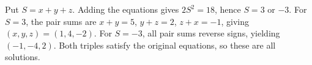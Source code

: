 Put $S=x+y+z$. Adding the equations gives $2S^2=18$, hence $S=3$ or $-3$. For $S=3$, the pair sums are $x+y=5$, $y+z=2$, $z+x=-1$, giving $(x,y,z)=(1,4,-2)$. For $S=-3$, all pair sums reverse signs, yielding $(-1,-4,2)$. Both triples satisfy the original equations, so these are all solutions.
